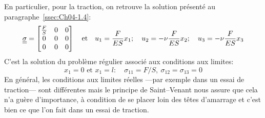 En particulier, pour la traction, on retrouve la solution présenté au paragraphe~\ref{ssec:Ch04-1.4}:
\begin{equation}
    \underline{\underline{\sigma}} = 
    \begin{bmatrix}
        \frac{F}{S} & 0 & 0 \\
        0 & 0 & 0 \\
        0 & 0 & 0
    \end{bmatrix}
    \quad\text{et}\quad
        u_1 = \frac{F}{ES} x_1;\quad
        u_2 = -\nu \frac{F}{ES} x_2;\quad
        u_3 = -\nu \frac{F}{ES}  x_3
    \label{eq:Ch07-023}
\end{equation}
C'est la solution du problème régulier associé aux conditions aux limites:
\begin{equation}
    x_1 = 0 \text{ et } x_1 = l: \quad \sigma_{11} = F/S, \ \sigma_{12} = \sigma_{13} = 0
    \label{eq:Ch07-024}
\end{equation}
En général, les conditions aux limites réelles ---par exemple dans un essai de traction--- sont différentes mais le principe de Saint--Venant nous assure que cela n'a guère d'importance, à condition de se placer loin des têtes d'amarrage et c'est bien ce que l'on fait dans un essai de traction.

